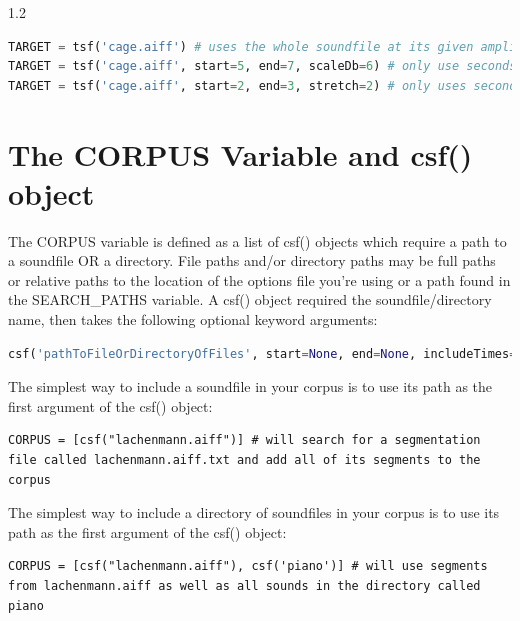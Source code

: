 \documentclass{article}
\begin{document}
\begin{spacing}{1.2}
\begin{lstlisting}[language=python]
TARGET = tsf('cage.aiff') # uses the whole soundfile at its given amplitude
TARGET = tsf('cage.aiff', start=5, end=7, scaleDb=6) # only use seconds 5-7 of cage.aiff at double the amplitude.
TARGET = tsf('cage.aiff', start=2, end=3, stretch=2) # only uses seconds 2-3, but stretches the sound with supervp to twice its duration before concatenation
\end{lstlisting}


\section{The CORPUS Variable and csf() object}
The CORPUS variable is defined as a list of csf() objects which require a path to a soundfile OR a directory.  File paths and/or directory paths may be full paths or relative paths to the location of the options file you're using or a path found in the SEARCH\_PATHS variable.  A csf() object required the soundfile/directory name, then takes the following optional keyword arguments:

\begin{lstlisting}[language=python]
csf('pathToFileOrDirectoryOfFiles', start=None, end=None, includeTimes=[], excludeTimes=[], limit=[], wholeFile=False, recursive=True, includeStr=None, excludeStr=None, scaleDb=0.0, limitDur=None, onsetLen=0.01, offsetLen='30%', postSelectAmpBool=False, postSelectAmpMethod='power-mean-seg', postSelectAmpMin=-12, postSelectAmpMax=+12, midiPitchMethod='composite', transMethod=None,  transQuantize=0, allowRepetition=True, restrictRepetition=0.5, restrictOverlaps=None, restrictInTime=0, scaleDistance=1, superimposeRule=None, segmentationFile=None, segmentationExtension='.txt')
\end{lstlisting}

The simplest way to include a soundfile in your corpus is to use its path as the first argument of the csf() object:
\begin{lstlisting}
CORPUS = [csf("lachenmann.aiff")] # will search for a segmentation file called lachenmann.aiff.txt and add all of its segments to the corpus
\end{lstlisting}

The simplest way to include a directory of soundfiles in your corpus is to use its path as the first argument of the csf() object:
\begin{lstlisting}
CORPUS = [csf("lachenmann.aiff"), csf('piano')] # will use segments from lachenmann.aiff as well as all sounds in the directory called piano
\end{lstlisting}


\end{spacing}
\end{document}
